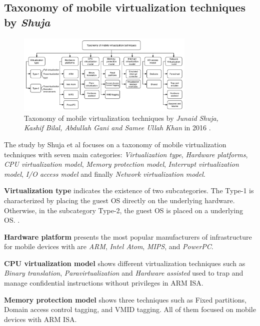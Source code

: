 	\subsection{Taxonomy of mobile virtualization techniques by \textit{Shuja}}
	
	\begin{figure}[H]
		\centering
		\includegraphics[width=8.5cm]{images/Shuja2016.pdf}
		\vspace{-0.2cm}
		\caption{Taxonomy of mobile virtualization techniques by \textit{Junaid Shuja, Kashif Bilal, Abdullah Gani and Samee Ullah Khan} in 2016 \cite{Shuja2016}.}
		\label{fig:TaxonomyByShuja}
	\end{figure}

	The study by Shuja et al \cite{Shuja2016} focuses on a taxonomy of mobile virtualization techniques with seven main categories: \textit{Virtualization type}, \textit{Hardware platforms}, \textit{CPU virtualization model}, \textit{Memory protection model}, \textit{Interrupt virtualization model}, \textit{I/O access model} and finally \textit{Network virtualization model}. 
	
	\textbf{Virtualization type} indicates the existence of two subcategories. The Type-1 is characterized by placing the guest OS directly on the underlying hardware. Otherwise, in the subcategory Type-2, the guest OS is placed on a underlying OS. \cite{Shuja2016, Zonghua2012}.
	
	\textbf{Hardware platform} presents the most popular manufacturers of infrastructure for mobile devices with are \textit{ARM}, \textit{Intel Atom}, \textit{MIPS}, and \textit{PowerPC}.
	
	\textbf{CPU virtualization model} shows different virtualization techniques such as \textit{Binary translation}, \textit{Paravirtualization} and \textit{Hardware assisted} used to trap and manage confidential instructions without privileges in ARM ISA. 
	
	\textbf{Memory protection model} shows three techniques such as Fixed partitions, Domain access control tagging, and VMID tagging. All of them focused on mobile devices with ARM ISA.

